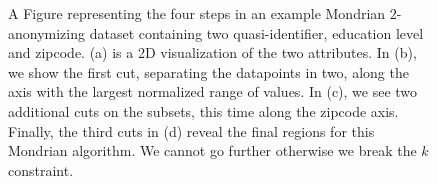 \begin{figure}
{    }
    \caption{A Figure representing the four steps in an example Mondrian $2$-anonymizing dataset containing two quasi-identifier, education level and zipcode. (a) is a 2D visualization of the two attributes. In (b), we show the first cut, separating the datapoints in two, along the axis with the largest normalized range of values. In (c), we see two additional cuts on the subsets, this time along the zipcode axis. Finally, the third cuts in (d) reveal the final regions for this Mondrian algorithm. We cannot go further otherwise we break the $k$ constraint.}
    \label{fig:mondrian_ex}
\end{figure}

